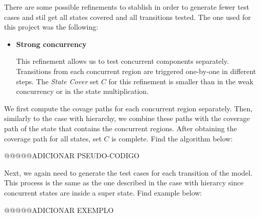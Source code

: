 There are some possible refinements to stablish in order to generate fewer test cases and stil get all states covered and all transitions tested. The one used for this project was the following:

\begin{itemize}

\item \textbf{Strong concurrency}

This refinement allows us to test concurrent components separately. Transitions from each concurrent region are triggered one-by-one in different steps.
The \textit{State Cover} set $C$ for this refinement is smaller than in the weak concurrency or in the state multiplication.
\end{itemize}

We first compute the covage paths for each concurrent region separately. Then, similarly to the case with hierarchy, we combine these paths with the coverage path of the state that contains the concurrent regions. After obtaining the coverage path for all states, set $C$ is complete. Find the algorithm below:

@@@@@ADICIONAR PSEUDO-CODIGO

Next, we again need to generate the test cases for each transition of the model. This process is the same as the one described in the case with hierarcy since concurrent states are inside a super state. Find example below:

@@@@@ADICIONAR EXEMPLO

